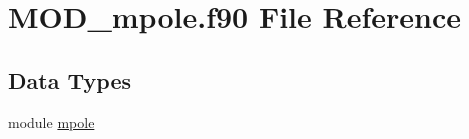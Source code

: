 \hypertarget{MOD__mpole_8f90}{\section{M\-O\-D\-\_\-mpole.\-f90 File Reference}
\label{MOD__mpole_8f90}
}
\subsection*{Data Types}
\begin{DoxyCompactItemize}
\item 
module \hyperlink{classmpole}{mpole}
\end{DoxyCompactItemize}
